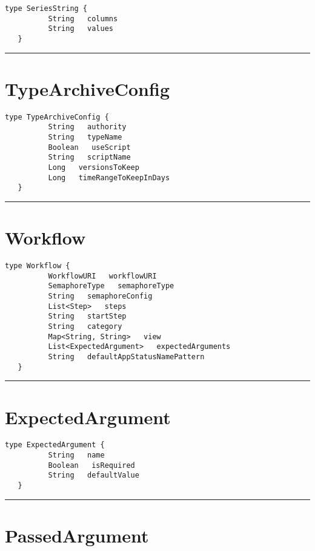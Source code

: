 \begin{lstlisting}[style=nonumbers]
   type SeriesString {
          String   columns
          String   values
   }
\end{lstlisting}

\rule{12cm}{2pt}
\section{TypeArchiveConfig}
\label{type:TypeArchiveConfig}

\begin{lstlisting}[style=nonumbers]
   type TypeArchiveConfig {
          String   authority
          String   typeName
          Boolean   useScript
          String   scriptName
          Long   versionsToKeep
          Long   timeRangeToKeepInDays
   }
\end{lstlisting}

\rule{12cm}{2pt}
\section{Workflow}
\label{type:Workflow}

\begin{lstlisting}[style=nonumbers]
   type Workflow {
          WorkflowURI   workflowURI
          SemaphoreType   semaphoreType
          String   semaphoreConfig
          List<Step>   steps
          String   startStep
          String   category
          Map<String, String>   view
          List<ExpectedArgument>   expectedArguments
          String   defaultAppStatusNamePattern
   }
\end{lstlisting}

\rule{12cm}{2pt}
\section{ExpectedArgument}
\label{type:ExpectedArgument}

\begin{lstlisting}[style=nonumbers]
   type ExpectedArgument {
          String   name
          Boolean   isRequired
          String   defaultValue
   }
\end{lstlisting}

\rule{12cm}{2pt}
\section{PassedArgument}
\label{type:PassedArgument}

